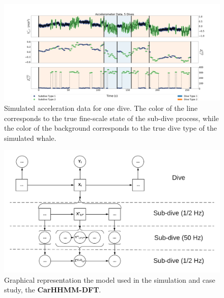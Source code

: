 
\begin{figure}[ht]
	\centering
	\includegraphics[width=5in]{../Plots/sim_data.png}
	\caption{Simulated acceleration data for one dive. The color of the line corresponds to the true fine-scale state of the sub-dive process, while the color of the background corresponds to the true dive type of the simulated whale.}
	\label{fig:sim_data}
\end{figure}

\begin{figure}[ht]
	\centering
	\includegraphics[width=5in]{../Plots/CarHHMM-DFT.png}
	\caption{Graphical representation the model used in the simulation and case study, the \textbf{CarHHMM-DFT}.}
	\label{fig:CarHHMM-DFT}
\end{figure}

